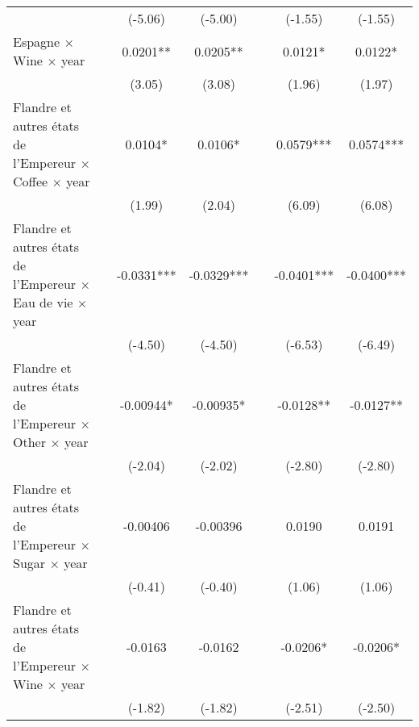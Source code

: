 {\begin{tabular}{l*{6}{c}}
                    &                     &     (-5.06)         &     (-5.00)         &                     &     (-1.55)         &     (-1.55)         \\
[1em]
Espagne $\times$ Wine $\times$ year&                     &      0.0201** &      0.0205** &                     &      0.0121*  &      0.0122*  \\
                    &                     &      (3.05)         &      (3.08)         &                     &      (1.96)         &      (1.97)         \\
[1em]
Flandre et autres états de l'Empereur $\times$ Coffee $\times$ year&                     &      0.0104*  &      0.0106*  &                     &      0.0579***&      0.0574***\\
                    &                     &      (1.99)         &      (2.04)         &                     &      (6.09)         &      (6.08)         \\
[1em]
Flandre et autres états de l'Empereur $\times$ Eau de vie $\times$ year&                     &     -0.0331***&     -0.0329***&                     &     -0.0401***&     -0.0400***\\
                    &                     &     (-4.50)         &     (-4.50)         &                     &     (-6.53)         &     (-6.49)         \\
[1em]
Flandre et autres états de l'Empereur $\times$ Other $\times$ year&                     &    -0.00944*  &    -0.00935*  &                     &     -0.0128** &     -0.0127** \\
                    &                     &     (-2.04)         &     (-2.02)         &                     &     (-2.80)         &     (-2.80)         \\
[1em]
Flandre et autres états de l'Empereur $\times$ Sugar $\times$ year&                     &    -0.00406         &    -0.00396         &                     &      0.0190         &      0.0191         \\
                    &                     &     (-0.41)         &     (-0.40)         &                     &      (1.06)         &      (1.06)         \\
[1em]
Flandre et autres états de l'Empereur $\times$ Wine $\times$ year&                     &     -0.0163         &     -0.0162         &                     &     -0.0206*  &     -0.0206*  \\
                    &                     &     (-1.82)         &     (-1.82)         &                     &     (-2.51)         &     (-2.50)         \\

\end{tabular}}
